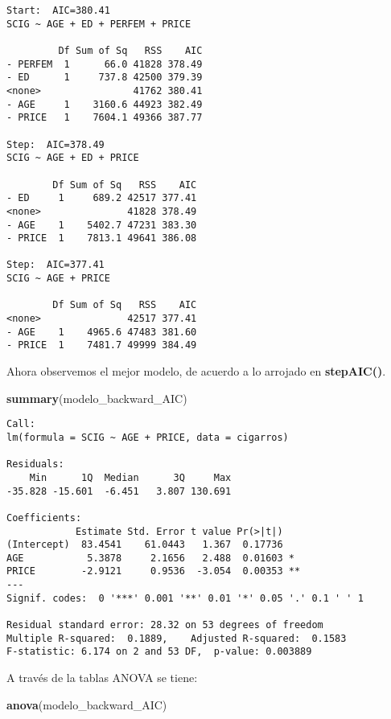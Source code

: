 \documentclass[
  a4paper,
  oneside,
  openany]{book}
\newenvironment{Shaded}{\begin{snugshade}}{\end{snugshade}}
\newcommand{\KeywordTok}[1]{\textcolor[rgb]{0.13,0.29,0.53}{\textbf{#1}}}
\newcommand{\NormalTok}[1]{#1}
\begin{document}
\begin{verbatim}
Start:  AIC=380.41
SCIG ~ AGE + ED + PERFEM + PRICE

         Df Sum of Sq   RSS    AIC
- PERFEM  1      66.0 41828 378.49
- ED      1     737.8 42500 379.39
<none>                41762 380.41
- AGE     1    3160.6 44923 382.49
- PRICE   1    7604.1 49366 387.77

Step:  AIC=378.49
SCIG ~ AGE + ED + PRICE

        Df Sum of Sq   RSS    AIC
- ED     1     689.2 42517 377.41
<none>               41828 378.49
- AGE    1    5402.7 47231 383.30
- PRICE  1    7813.1 49641 386.08

Step:  AIC=377.41
SCIG ~ AGE + PRICE

        Df Sum of Sq   RSS    AIC
<none>               42517 377.41
- AGE    1    4965.6 47483 381.60
- PRICE  1    7481.7 49999 384.49
\end{verbatim}

Ahora observemos el mejor modelo, de acuerdo a lo arrojado en \textbf{stepAIC()}.

\begin{Shaded}
\begin{Highlighting}[]
\KeywordTok{summary}\NormalTok{(modelo\_backward\_AIC)}
\end{Highlighting}
\end{Shaded}

\begin{verbatim}
Call:
lm(formula = SCIG ~ AGE + PRICE, data = cigarros)

Residuals:
    Min      1Q  Median      3Q     Max 
-35.828 -15.601  -6.451   3.807 130.691 

Coefficients:
            Estimate Std. Error t value Pr(>|t|)   
(Intercept)  83.4541    61.0443   1.367  0.17736   
AGE           5.3878     2.1656   2.488  0.01603 * 
PRICE        -2.9121     0.9536  -3.054  0.00353 **
---
Signif. codes:  0 '***' 0.001 '**' 0.01 '*' 0.05 '.' 0.1 ' ' 1

Residual standard error: 28.32 on 53 degrees of freedom
Multiple R-squared:  0.1889,    Adjusted R-squared:  0.1583 
F-statistic: 6.174 on 2 and 53 DF,  p-value: 0.003889
\end{verbatim}

A través de la tablas ANOVA se tiene:

\begin{Shaded}
\begin{Highlighting}[]
\KeywordTok{anova}\NormalTok{(modelo\_backward\_AIC)}
\end{Highlighting}
\end{Shaded}
\end{document}
